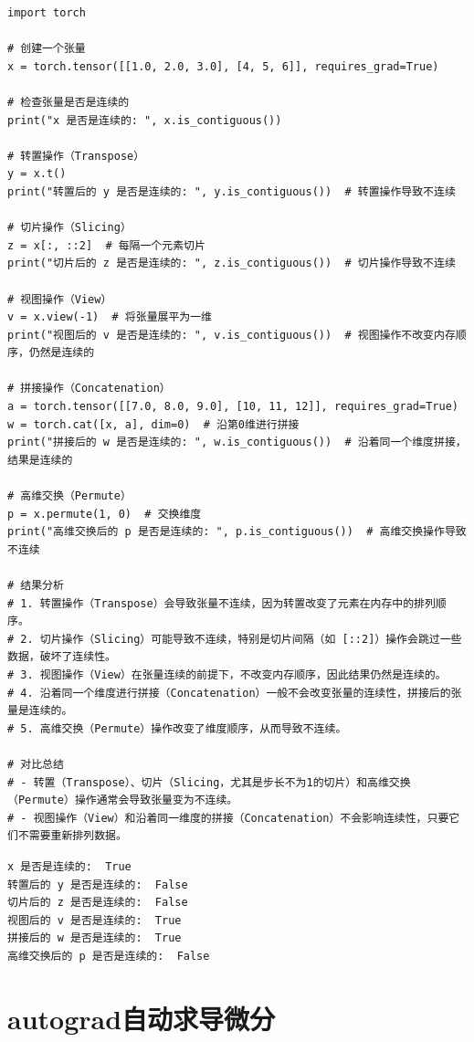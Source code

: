 \begin{lstlisting}[style=pythonstyle]
import torch

# 创建一个张量
x = torch.tensor([[1.0, 2.0, 3.0], [4, 5, 6]], requires_grad=True)

# 检查张量是否是连续的
print("x 是否是连续的: ", x.is_contiguous())

# 转置操作（Transpose）
y = x.t()
print("转置后的 y 是否是连续的: ", y.is_contiguous())  # 转置操作导致不连续

# 切片操作（Slicing）
z = x[:, ::2]  # 每隔一个元素切片
print("切片后的 z 是否是连续的: ", z.is_contiguous())  # 切片操作导致不连续

# 视图操作（View）
v = x.view(-1)  # 将张量展平为一维
print("视图后的 v 是否是连续的: ", v.is_contiguous())  # 视图操作不改变内存顺序，仍然是连续的

# 拼接操作（Concatenation）
a = torch.tensor([[7.0, 8.0, 9.0], [10, 11, 12]], requires_grad=True)
w = torch.cat([x, a], dim=0)  # 沿第0维进行拼接
print("拼接后的 w 是否是连续的: ", w.is_contiguous())  # 沿着同一个维度拼接，结果是连续的

# 高维交换（Permute）
p = x.permute(1, 0)  # 交换维度
print("高维交换后的 p 是否是连续的: ", p.is_contiguous())  # 高维交换操作导致不连续

# 结果分析
# 1. 转置操作（Transpose）会导致张量不连续，因为转置改变了元素在内存中的排列顺序。
# 2. 切片操作（Slicing）可能导致不连续，特别是切片间隔（如 [::2]）操作会跳过一些数据，破坏了连续性。
# 3. 视图操作（View）在张量连续的前提下，不改变内存顺序，因此结果仍然是连续的。
# 4. 沿着同一个维度进行拼接（Concatenation）一般不会改变张量的连续性，拼接后的张量是连续的。
# 5. 高维交换（Permute）操作改变了维度顺序，从而导致不连续。

# 对比总结
# - 转置（Transpose）、切片（Slicing，尤其是步长不为1的切片）和高维交换（Permute）操作通常会导致张量变为不连续。
# - 视图操作（View）和沿着同一维度的拼接（Concatenation）不会影响连续性，只要它们不需要重新排列数据。
\end{lstlisting}
\begin{lstlisting}[style=demostyle,numbers=none]
x 是否是连续的:  True
转置后的 y 是否是连续的:  False
切片后的 z 是否是连续的:  False
视图后的 v 是否是连续的:  True
拼接后的 w 是否是连续的:  True
高维交换后的 p 是否是连续的:  False
\end{lstlisting}




\section{autograd自动求导微分}
\label{sec:Pytorch的autograd自动求导微分}
